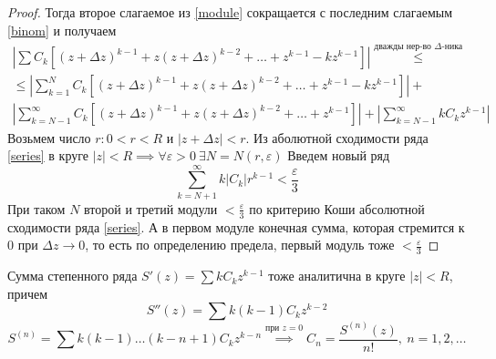 \begin{theorem*}
\begin{proof}
        Тогда второе слагаемое из \eqref{module} сокращается с последним слагаемым \eqref{binom} и получаем
        \begin{multline*}
            \left| \sum C_k \left[ (z + \Delta z)^{k-1} + z(z + \Delta z)^{k-2} + \hdots + z^{k-1} - kz^{k-1} \right] \right| \overset{\text{дважды нер-во } \Delta\text{-ника}}{\leq} \\
            \leq \left| \sum_{k = 1}^{N} C_k\left[(z+\Delta z)^{k-1} + z(z +\Delta z)^{k-2} + \hdots + z^{k-1} - kz^{k-1}\right]\right| + \\
            \left| \sum_{k = N-1}^{\infty} C_k \left[ (z+ \Delta z)^{k-1} + z(z+ \Delta z)^{k-2} + \hdots + z^{k-1} \right]\right| + \left| \sum_{k=N-1}^{\infty} kC_k z^{k-1}\right|
        \end{multline*}
        Возьмем число $r: 0 < r < R$ и $\left| z + \Delta z \right| < r$. Из аболютной сходимости ряда \eqref{series} в круге $\left| z \right| < R \implies \forall \varepsilon > 0 \ \exists N = N(r, \varepsilon)$
        Введем новый ряд 
        \[\sum_{k=N+1}^{\infty} k\left| C_k \right| r^{k-1} < \frac{\varepsilon}{3}\]
        При таком $N$ второй и третий модули $< \frac{\varepsilon}{3}$ по критерию Коши абсолютной сходимости ряда \eqref{series}. А в первом модуле конечная сумма, которая стремится к 0 при $\Delta z \to 0$, то есть по определению предела, первый модуль тоже $< \frac{\varepsilon}{3}$
    \end{proof}
\end{theorem*}


\begin{note}
    Сумма степенного ряда $S'(z) = \sum kC_kz^{k-1}$ тоже аналитична в круге $\left| z \right| < R$, причем 
    \[S''(z) = \sum k(k-1)C_k z^{k-2}\]
    \[S^{(n)} = \sum k(k-1)\hdots(k-n+1)C_k z^{k-n} \overset{\text{при } z = 0}{\implies} C_n = \frac{S^{(n)}(z)}{n!}, \ n = 1, 2, \hdots\]
\end{note}